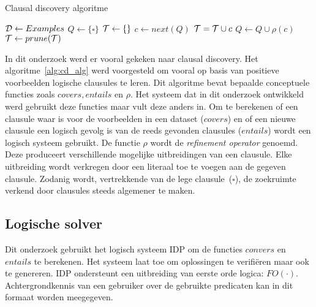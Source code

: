 \begin{algorithm}
  \caption{Clausal discovery algoritme}
  \label{alg:cd_alg}

  \begin{algorithmic}
  \State $\mathcal{D} \gets Examples$
  \State $Q \gets \{\square\}$
  \State $\mathcal{T} \gets \{\}$
    \State $c \gets next(Q)$
        \State $\mathcal{T} = \mathcal{T} \cup c$
      \EndIf
    \Else
      \State $Q \gets Q \cup \rho(c)$
    \EndIf
  \EndWhile
  \State $\mathcal{T} \gets prune(\mathcal{T})$
  \State \Return {}
\end{algorithmic}
\end{algorithm}

In dit onderzoek werd er vooral gekeken naar clausal discovery\cite{DeRaedt:ClausalDiscovery}.
Het algoritme~\ref{alg:cd_alg} werd voorgesteld om vooral op basis van positieve voorbeelden logische clausules te leren.
Dit algoritme bevat bepaalde conceptuele functies zoals $\mathit{covers}, \mathit{entails}$ en $\rho$.
Het systeem dat in dit onderzoek ontwikkeld werd gebruikt deze functies maar vult deze anders in.
Om te berekenen of een clausule waar is voor de voorbeelden in een dataset ($\mathit{covers}$) en of een nieuwe clausule een logisch gevolg is van de reeds gevonden clausules ($\mathit{entails}$) wordt een logisch systeem gebruikt.
De functie $\rho$ wordt de \textit{refinement operator} genoemd.
Deze produceert verschillende mogelijke uitbreidingen van een clausule.
Elke uitbreiding wordt verkregen door een literaal toe te voegen aan de gegeven clausule.
Zodanig wordt, vertrekkende van de lege clausule~($\square$), de zoekruimte verkend door clausules steeds algemener te maken.

\subsection{Logische solver}
Dit onderzoek gebruikt het logisch systeem IDP\cite{de2013prototype,wittocx2008idp} om de functies $\mathit{convers}$ en $\mathit{entails}$ te berekenen.
Het systeem laat toe om oplossingen te verifi\"eren maar ook te genereren.
IDP ondersteunt een uitbreiding van eerste orde logica: $FO(\cdot)$.
Achtergrondkennis van een gebruiker over de gebruikte predicaten kan in dit formaat worden meegegeven.

